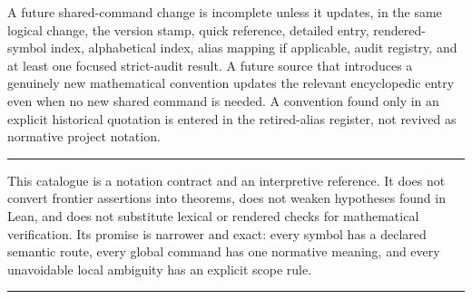 \documentclass[11pt,oneside]{article}
\theoremstyle{definition}
\theoremstyle{remark}
\newenvironment{boxedremark}{%
  \par\smallskip\noindent\begin{center}\begin{minipage}{0.94\textwidth}%
  \color{black}\hrule\vspace{0.6em}\small
}{%
  \vspace{0.6em}\hrule\end{minipage}\end{center}\smallskip
}
\begin{document}
A future shared-command change is incomplete unless it updates, in the same logical
change, the version stamp, quick reference, detailed entry, rendered-symbol index,
alphabetical index, alias mapping if applicable, audit registry, and at least one focused
strict-audit result.  A future source that introduces a genuinely new mathematical
convention updates the relevant encyclopedic entry even when no new shared command is
needed.  A convention found only in an explicit historical quotation is entered in the
retired-alias register, not revived as normative project notation.

\begin{boxedremark}
This catalogue is a notation contract and an interpretive reference.  It does not convert
frontier assertions into theorems, does not weaken hypotheses found in Lean, and does not
substitute lexical or rendered checks for mathematical verification.  Its promise is
narrower and exact: every symbol has a declared semantic route, every global command has
one normative meaning, and every unavoidable local ambiguity has an explicit scope rule.
\end{boxedremark}
\end{document}
